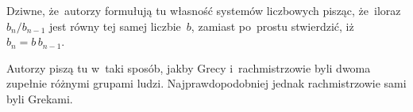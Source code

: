 \documentclass[a4paper,11pt]{article}
\begin{document}




\vspace{\spaceTwo} \vspace{\spaceThree}






\start {} Dziwne, że~autorzy formułują tu własność systemów
liczbowych pisząc, że~iloraz $b_{ n } / b_{ n - 1 }$ jest równy tej
samej liczbie~$b$, zamiast po~prostu stwierdzić,
iż~$b_{ n } = b \, b_{ n - 1 }$.

\vspace{\spaceFour}


\start {} Autorzy piszą tu w~taki sposób, jakby Grecy
i~rachmistrzowie byli dwoma zupełnie różnymi grupami ludzi.
Najprawdopodobniej jednak rachmistrzowie sami byli Grekami.
\end{document}
